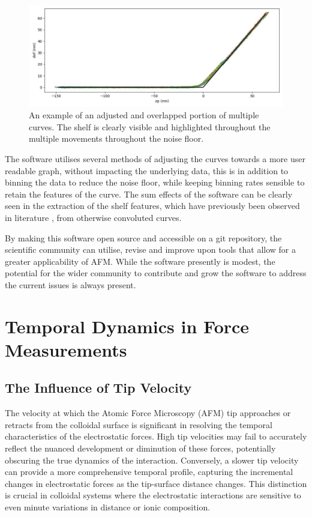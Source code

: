 \begin{figure}[h!]
\centering
\includegraphics[width=\textwidth]{chapter8/Shelf/Post 1.6 S4 df_zp.jpg}
\caption{An example of an adjusted and overlapped portion of multiple curves. The shelf is clearly visible and highlighted throughout the multiple movements throughout the noise floor.}
\label{fig:noisey}
\end{figure}

The software utilises several methods of adjusting the curves towards a more user readable graph, without impacting the underlying data, this is in addition to binning the data to reduce the noise floor, while keeping binning rates sensible to retain the features of the curve. The sum effects of the software can be clearly seen in the extraction of the shelf features, which have previously been observed in literature \cite{Kilpatrick2013DirectlyProbing}, from otherwise convoluted curves. %

By making this software open source and accessible on a git repository, the scientific community can utilise, revise and improve upon tools that allow for a greater applicability of AFM. While the software presently is modest, the potential for the wider community to contribute and grow the software to address the current issues is always present. \cite{YourGithub2023}

\section{Temporal Dynamics in Force Measurements}

\subsection{The Influence of Tip Velocity}
The velocity at which the Atomic Force Microscopy (AFM) tip approaches or retracts from the colloidal surface is significant in resolving the temporal characteristics of the electrostatic forces. High tip velocities may fail to accurately reflect the nuanced development or diminution of these forces, potentially obscuring the true dynamics of the interaction. Conversely, a slower tip velocity can provide a more comprehensive temporal profile, capturing the incremental changes in electrostatic forces as the tip-surface distance changes. This distinction is crucial in colloidal systems where the electrostatic interactions are sensitive to even minute variations in distance or ionic composition.

